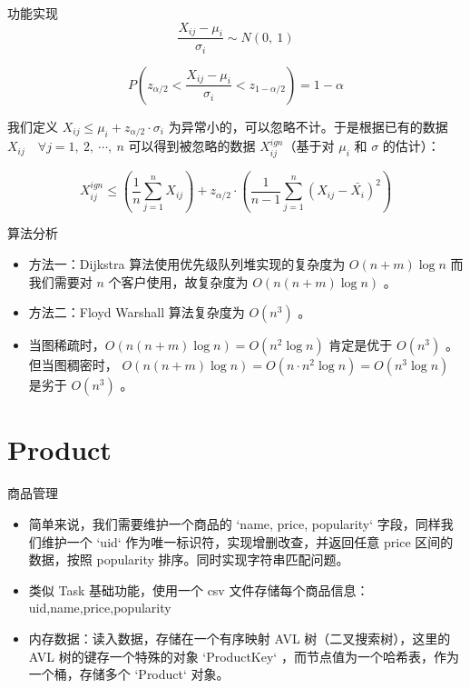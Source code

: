 \documentclass{beamer}
\begin{document}
\begin{frame}{功能实现}
\begin{equation*}
\frac{X_{ij} - \mu_i}{\sigma_i} \sim N(0,\ 1)
\end{equation*}

\begin{equation*}
P\left( z_{\alpha/2} < \frac{X_{ij} - \mu_i}{\sigma_i} < z_{1-\alpha/2} \right) = 1 - \alpha
\end{equation*}

我们定义 $X_{ij} \leq \mu_i + z_{\alpha/2}\cdot \sigma_i$ 为异常小的，可以忽略不计。于是根据已有的数据 $X_{ij}\quad \forall j = 1,\ 2,\ \cdots,\ n$ 可以得到被忽略的数据 $X^{ign}_{ij}$（基于对 $\mu_i$ 和 $\sigma$ 的估计）：

\begin{equation*}
X^{ign}_{ij} \leq \left(\frac{1}{n}\sum_{j=1}^n X_{ij}\right) + z_{\alpha/2}\cdot  \left( \frac{1}{n-1}\sum_{j=1}^n (X_{ij} - \bar{X_i})^2\right)
\end{equation*}
\end{frame}

\begin{frame}{算法分析}
\begin{itemize}
\item 方法一：Dijkstra 算法使用优先级队列堆实现的复杂度为 $O(n+m)\log n$ 而我们需要对 $n$ 个客户使用，故复杂度为 $O(n(n+m)\log n)$ 。
\item 方法二：Floyd Warshall 算法复杂度为 $O(n^3)$ 。
\item 当图稀疏时，$O(n(n+m)\log n) = O(n^2 \log n)$ 肯定是优于 $O(n^3)$ 。但当图稠密时， $O(n(n+m)\log n) = O(n \cdot n^2 \log n) = O(n^3\log n)$ 是劣于 $O(n^3)$ 。
\end{itemize}
\end{frame}


\section{Product}


\begin{frame}{商品管理}
\begin{itemize}
\item 简单来说，我们需要维护一个商品的 `name, price, popularity` 字段，同样我们维护一个 `uid` 作为唯一标识符，实现增删改查，并返回任意 price 区间的数据，按照 popularity 排序。同时实现字符串匹配问题。
\item 类似 Task 基础功能，使用一个 csv 文件存储每个商品信息：uid,name,price,popularity
\item 内存数据：读入数据，存储在一个有序映射 AVL 树（二叉搜索树），这里的 AVL 树的键存一个特殊的对象 `ProductKey` ，而节点值为一个哈希表，作为一个桶，存储多个 `Product` 对象。
\end{itemize}
\end{frame}
\end{document}
